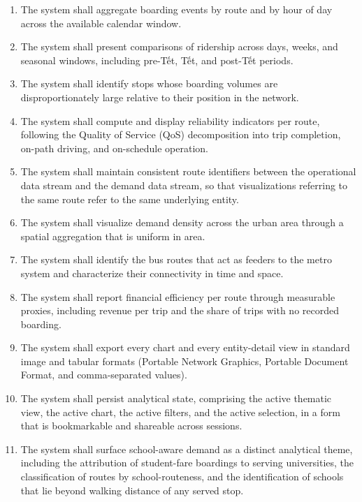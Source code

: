 \begin{enumerate}
  \item[\textbf{R1.}] The system shall aggregate boarding events by route and by hour of day across the available calendar window.
  \item[\textbf{R2.}] The system shall present comparisons of ridership across days, weeks, and seasonal windows, including pre-Tết, Tết, and post-Tết periods.
  \item[\textbf{R3.}] The system shall identify stops whose boarding volumes are disproportionately large relative to their position in the network.
  \item[\textbf{R4.}] The system shall compute and display reliability indicators per route, following the Quality of Service (QoS) decomposition into trip completion, on-path driving, and on-schedule operation.
  \item[\textbf{R5.}] The system shall maintain consistent route identifiers between the operational data stream and the demand data stream, so that visualizations referring to the same route refer to the same underlying entity.
  \item[\textbf{R6.}] The system shall visualize demand density across the urban area through a spatial aggregation that is uniform in area.
  \item[\textbf{R7.}] The system shall identify the bus routes that act as feeders to the metro system and characterize their connectivity in time and space.
  \item[\textbf{R8.}] The system shall report financial efficiency per route through measurable proxies, including revenue per trip and the share of trips with no recorded boarding.
  \item[\textbf{R9.}] The system shall export every chart and every entity-detail view in standard image and tabular formats (Portable Network Graphics, Portable Document Format, and comma-separated values).
  \item[\textbf{R10.}] The system shall persist analytical state, comprising the active thematic view, the active chart, the active filters, and the active selection, in a form that is bookmarkable and shareable across sessions.
  \item[\textbf{R11.}] The system shall surface school-aware demand as a distinct analytical theme, including the attribution of student-fare boardings to serving universities, the classification of routes by school-routeness, and the identification of schools that lie beyond walking distance of any served stop.

\end{enumerate}
